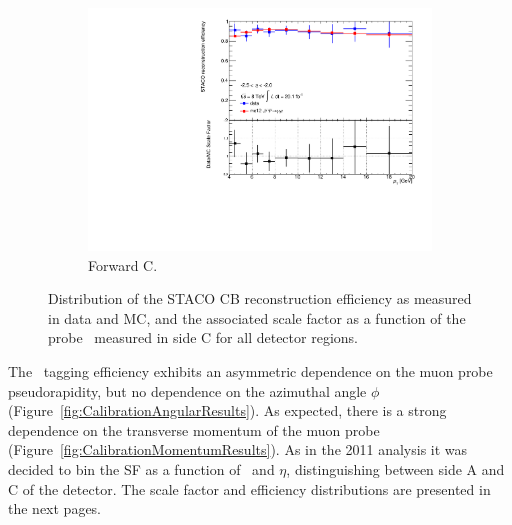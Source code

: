 \begin{figure}[htbp]
    \begin{subfigure}[b]{0.45\textwidth}
      \includegraphics[width=\textwidth]{PartCalibration2012/Plots/SFPlots/Forward_C_reco.pdf}
      \caption{Forward C.}\label{fig:CalibrationRecoSFForwardC}
    \end{subfigure}
    \caption{Distribution of the STACO CB reconstruction efficiency as measured in data and MC, and the associated scale factor as a function of the probe \pt\ measured in side C for all detector regions.}\label{fig:RecoEffSideC}
\end{figure}

The \xsm\ tagging efficiency exhibits an asymmetric dependence on the muon probe pseudorapidity, but no dependence on the azimuthal angle $\phi$ (Figure~\ref{fig:CalibrationAngularResults}). As expected, there is a strong dependence on the transverse momentum of the muon probe (Figure~\ref{fig:CalibrationMomentumResults}). As in the 2011 analysis it was decided to bin the SF as a function of \pt\ and $\eta$, distinguishing between side A and C of the detector. The scale factor and efficiency distributions are presented in the next pages. 

